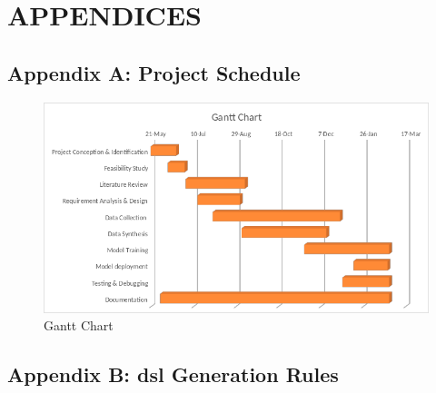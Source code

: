\section{\MakeUppercase{Appendices}} \label{sec:appendices}
   
    \subsection*{Appendix A: Project Schedule}
    \begin{figure}[H]
        \includegraphics[width=\textwidth]{images/gantt.png}\caption{Gantt Chart}\label{fig:tabgant}
    \end{figure}

    
    \subsection*{Appendix B: \gls{dsl} Generation Rules}

